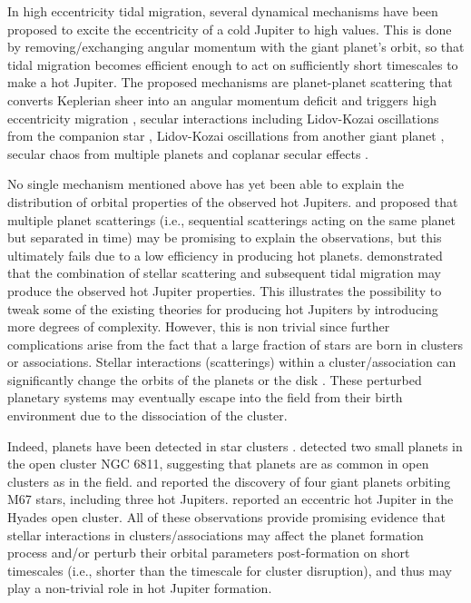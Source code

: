 \documentclass[twocolumn]{aastex63}
\begin{document}
In high eccentricity tidal migration, several dynamical mechanisms have been proposed to excite the eccentricity of a cold Jupiter to high values.  This is done by removing/exchanging angular momentum with the giant planet's orbit, so that tidal migration becomes efficient enough to act on sufficiently short timescales to make a hot Jupiter. The proposed mechanisms are planet-planet scattering that converts Keplerian sheer into an angular momentum deficit and triggers high eccentricity migration \citep{Rasio1996,Weidenschilling1996, Ford2006,Chatterjee2008}, secular interactions including Lidov-Kozai oscillations from the companion star \citep{Wu2003, Fabrycky2007, Katz2011,Naoz2012,Petrovich2015}, Lidov-Kozai oscillations from another giant planet \citep{Naoz2011,Teyssandier2013}, secular chaos from multiple planets \citep{Wu2011,Hamers2017,Xu2016,Li2019,Li2020} and coplanar secular effects \citep{Li2014}.    

No single mechanism mentioned above has yet been able to explain the distribution of orbital properties of the observed hot Jupiters. \citet{Ford2003} and \citet{Ford2006} proposed that multiple planet scatterings (i.e., sequential scatterings acting on the same planet but separated in time) may  be promising to explain the observations, but this ultimately fails due to a low efficiency in producing hot planets. \citet{Adams2005} demonstrated that the combination of stellar scattering and subsequent tidal migration may produce the observed hot Jupiter properties. This illustrates the possibility to tweak some of the existing theories for producing hot Jupiters by introducing more degrees of complexity. However, this is non trivial since further complications arise from the fact that a large fraction of stars are born in clusters or associations. Stellar interactions (scatterings) within a cluster/association can significantly change the orbits of the planets or the disk \citep{Hurley2002,Adams2006, Spurzem2009, Li2015, Shara2016}. These perturbed planetary systems may eventually escape into the field from their birth environment due to the dissociation of the cluster.

Indeed, planets have been detected in star clusters \citep{Lovis2007, Sato2007}. \citet{Meibom2013} detected two small planets in the open cluster NGC 6811, suggesting that planets are as common in open clusters as in the field. \citet{Quinn2012} and \citet{Brucalassi2016} reported the discovery of four giant planets orbiting M67 stars, including three hot Jupiters. \citet{Quinn2014} reported an eccentric hot Jupiter in the Hyades open cluster. All of these observations provide promising evidence that stellar interactions in clusters/associations may affect the planet formation process and/or perturb their orbital parameters post-formation on short timescales (i.e., shorter than the timescale for cluster disruption), and thus may play a non-trivial role in hot Jupiter formation.
\end{document}
